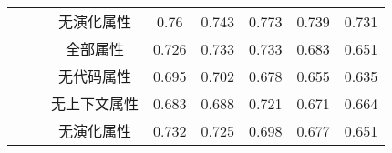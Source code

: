 \begin{table} [htbp]
\begin{tabular}{cccccccc}
&&无演化属性& 0.76     & 0.743  & 0.773 & 0.739 & 0.731 \\
\cline{2-8}
&~\multirow{4}{*}{Tuxguitar} 
&全部属性         & 0.726    & 0.733  & 0.733 & 0.683 & 0.651 \\
&&无代码属性 & 0.695    & 0.702  & 0.678 & 0.655 & 0.635 \\
&&无上下文属性   & 0.683    & 0.688  & 0.721 & 0.671 & 0.664 \\
&&无演化属性& 0.732    & 0.725  & 0.698 & 0.677 & 0.651\\
\bottomrule[1.5pt]
\end{tabular}
\end{table} 


